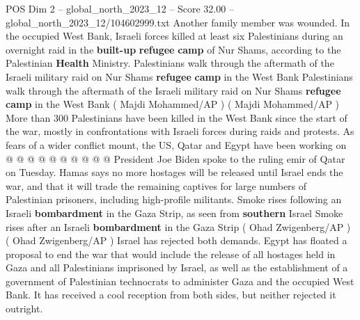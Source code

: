 \begin{textsample}{POS Dim 2 – global\_north\_2023\_12 – Score 32.00 – global\_north\_2023\_12/104602999.txt}
Another family member was wounded.
In the occupied West Bank, Israeli forces killed at least six Palestinians during an overnight raid in the \textbf{built-up} \textbf{refugee} \textbf{camp} of Nur Shams, according to the Palestinian \textbf{Health} Ministry.
Palestinians walk through the aftermath of the Israeli military raid on Nur Shams \textbf{refugee} \textbf{camp} in the West Bank Palestinians walk through the aftermath of the Israeli military raid on Nur Shams \textbf{refugee} \textbf{camp} in the West Bank ( Majdi Mohammed/AP ) ( Majdi Mohammed/AP ) More than 300 Palestinians have been killed in the West Bank since the start of the war, mostly in confrontations with Israeli forces during raids and protests.
As fears of a wider conflict mount, the US, Qatar and Egypt have been working on @ @ @ @ @ @ @ @ @ @ President Joe Biden spoke to the ruling emir of Qatar on Tuesday.
Hamas says no more hostages will be released until Israel ends the war, and that it will trade the remaining captives for large numbers of Palestinian prisoners, including high-profile militants.
Smoke rises following an Israeli \textbf{bombardment} in the Gaza Strip, as seen from \textbf{southern} Israel Smoke rises after an Israeli \textbf{bombardment} in the Gaza Strip ( Ohad Zwigenberg/AP ) ( Ohad Zwigenberg/AP ) Israel has rejected both demands.
Egypt has floated a proposal to end the war that would include the release of all hostages held in Gaza and all Palestinians imprisoned by Israel, as well as the establishment of a government of Palestinian technocrats to administer Gaza and the occupied West Bank.
It has received a cool reception from both sides, but neither rejected it outright.

\end{textsample}
